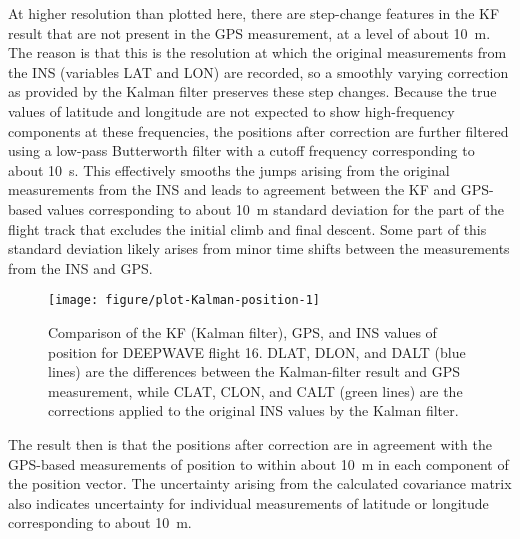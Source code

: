 \documentclass[12pt,twoside,english,12pt,twoside,english]{article}\usepackage[]{graphicx}\usepackage[]{color}
\makeatletter
\def\maxwidth{ %
  \ifdim\Gin@nat@width>\linewidth
    \linewidth
  \else
    \Gin@nat@width
  \fi
}
\newenvironment{knitrout}{}{} %
\let\OrgIndex\index
\renewcommand*{\index}[1]{\OrgIndex{#1}}
\makeatother
\begin{document}
At higher resolution than plotted here, there are step-change features
in the KF result that are not present in the GPS measurement, at a
level of about 10~m. The reason is that this is the resolution
at which the original measurements from the INS
(variables LAT and LON) are recorded, so a smoothly varying correction
as provided by the Kalman filter preserves these step changes. Because
the true values of latitude and longitude
are not expected to show high-frequency components at these frequencies,
the positions after correction are further filtered
using a low-pass Butterworth filter with a cutoff frequency
corresponding to about 10~s. This effectively smooths the jumps arising
from the original measurements from the
INS and leads to agreement between the KF and GPS-based
values corresponding to about 10~m standard deviation
for the part of the flight track that excludes the initial climb and
final descent. Some part of this standard deviation likely arises
from minor time shifts between the measurements from the INS and GPS.

\begin{knitrout}
\color{fgcolor}\begin{figure}

{\centering \texttt{[image: figure/plot-Kalman-position-1]} 

}

\caption[Comparison of the Kalman filter, GPS, and INS values for latitude, longitude and altitude, with corrections from the Kalman filter also shown.]{Comparison of the KF (Kalman filter), GPS, and INS values of position for DEEPWAVE flight 16. DLAT, DLON, and DALT (blue lines) are the differences between the Kalman-filter result and GPS measurement, while CLAT, CLON, and CALT (green lines) are the corrections applied to the original INS values by the Kalman filter.}\label{fig:plot-Kalman-position}
\end{figure}


\end{knitrout}

The result then is that the positions
after correction are in agreement with the GPS-based
measurements of position to within about 10~m in each component of
the position vector. The uncertainty arising from the calculated covariance
matrix also indicates uncertainty
for individual measurements of latitude
or longitude corresponding to about 10~m.
\end{document}
